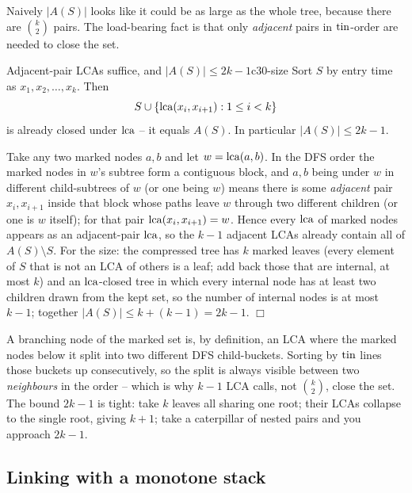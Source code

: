 Naively \(|A(S)|\) looks like it could be as large as the whole tree, because there
are \(\binom{k}{2}\) pairs.  The load-bearing fact is that only \emph{adjacent}
pairs in \(\operatorname{tin}\)-order are needed to close the set.

\begin{theorem}{Adjacent-pair LCAs suffice, and \(|A(S)|\le 2k-1\)}{c30-size}
Sort \(S\) by entry time as \(x_1,x_2,\dots,x_k\).  Then
\[
   S\cup\{\operatorname{lca}(x_i,x_{i+1}): 1\le i<k\}
\]
is already closed under \(\operatorname{lca}\) -- it equals \(A(S)\).  In particular \(|A(S)|\le
2k-1\).
\end{theorem}
\begin{proofbox}
Take any two marked nodes \(a,b\) and let \(w=\operatorname{lca}(a,b)\).  In the DFS order the
marked nodes in \(w\)'s subtree form a contiguous block, and \(a,b\) being under
\(w\) in different child-subtrees of \(w\) (or one being \(w\)) means there is some
\emph{adjacent} pair \(x_i,x_{i+1}\) inside that block whose paths leave \(w\)
through two different children (or one is \(w\) itself); for that pair
\(\operatorname{lca}(x_i,x_{i+1})=w\).  Hence every \(\operatorname{lca}\) of marked nodes appears as an
adjacent-pair \(\operatorname{lca}\), so the \(k-1\) adjacent LCAs already contain all of
\(A(S)\setminus S\).  For the size: the compressed tree has \(k\) marked leaves
(every element of \(S\) that is not an LCA of others is a leaf; add back those that
are internal, at most \(k\)) and an \(\operatorname{lca}\)-closed tree in which every internal node
has at least two children drawn from the kept set, so the number of internal nodes
is at most \(k-1\); together \(|A(S)|\le k+(k-1)=2k-1\). \(\Box\)
\end{proofbox}

\begin{insightbox}
A branching node of the marked set is, by definition, an LCA where the marked nodes
below it split into two different DFS child-buckets.  Sorting by \(\operatorname{tin}\) lines those
buckets up consecutively, so the split is always visible between two \emph{neighbours}
in the order -- which is why \(k-1\) LCA calls, not \(\binom{k}{2}\), close the set.
The bound \(2k-1\) is tight: take \(k\) leaves all sharing one root; their LCAs collapse
to the single root, giving \(k+1\); take a caterpillar of nested pairs and you approach
\(2k-1\).
\end{insightbox}

\subsection{Linking with a monotone stack}

